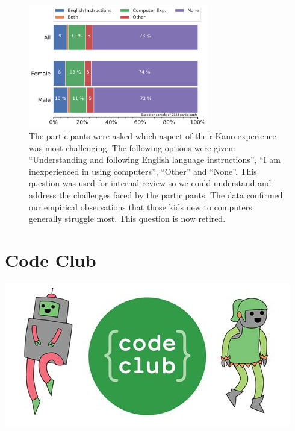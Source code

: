 \documentclass[12pt]{report} %
\begin{document}
\begin{figure}[t!]
    \centering
        \includegraphics[width=0.7\textwidth]{bar_challenge}
\caption{\small The participants were asked which aspect of their Kano experience was most challenging. The following options were given: ``Understanding and following English language instructions'', ``I am inexperienced in using computers'', ``Other'' and ``None''. This question was used for internal review so we could understand and address the challenges faced by the participants. The data confirmed our empirical observations that those kids new to computers generally struggle most. This question is now retired.} 
\label{fig:challenge}
\end{figure}



\chapter{Code Club}\label{chapter:codeclub}


\includegraphics[width=0.7\linewidth, left]{codeclub.jpeg}
\end{document}
